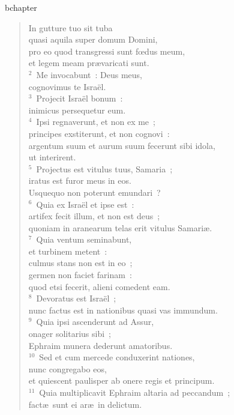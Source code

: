 bchapter\begin{flushleft}\begin{verse}\vspace{-19pt}In gutture tuo sit tuba\\ quasi aquila super domum Domini,\\ pro eo quod transgressi sunt fœdus meum,\\ et legem meam pr\ae varicati sunt.\\
${}^{2}$~Me invocabunt~: Deus meus,\\ cognovimus te Isra\"el.\\
${}^{3}$~Projecit Isra\"el bonum~:\\ inimicus persequetur eum.\\
${}^{4}$~Ipsi regnaverunt, et non ex me~;\\ principes exstiterunt, et non cognovi~:\\ argentum suum et aurum suum fecerunt sibi idola,\\ ut interirent.\\
${}^{5}$~Projectus est vitulus tuus, Samaria~;\\ iratus est furor meus in eos.\\ Usquequo non poterunt emundari~?\\
${}^{6}$~Quia ex Isra\"el et ipse est~:\\ artifex fecit illum, et non est deus~;\\ quoniam in aranearum telas erit vitulus Samari\ae .\\
${}^{7}$~Quia ventum seminabunt,\\ et turbinem metent~:\\ culmus stans non est in eo~;\\ germen non faciet farinam~:\\ quod etsi fecerit, alieni comedent eam.\\
${}^{8}$~Devoratus est Isra\"el~;\\ nunc factus est in nationibus quasi vas immundum.\\
${}^{9}$~Quia ipsi ascenderunt ad Assur,\\ onager solitarius sibi~;\\ Ephraim munera dederunt amatoribus.\\
${}^{10}$~Sed et cum mercede conduxerint nationes,\\ nunc congregabo eos,\\ et quiescent paulisper ab onere regis et principum.\\
${}^{11}$~Quia multiplicavit Ephraim altaria ad peccandum~;\\ fact\ae\ sunt ei ar\ae\ in delictum.\\

\end{verse}
\end{flushleft}
